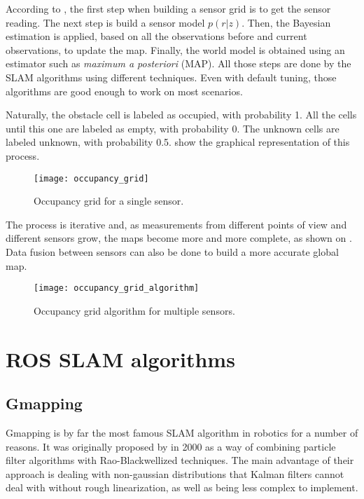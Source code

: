 According to , the first step when building a sensor grid is to get the sensor reading. The next step is build a sensor model $p(r|z)$. Then, the Bayesian estimation is applied, based on all the observations before and current observations, to update the map. Finally, the world model is obtained using an estimator such as \textit{maximum a posteriori} (MAP). All those steps are done by the SLAM algorithms using different techniques. Even with default tuning, those algorithms are good enough to work on most scenarios.

Naturally, the obstacle cell is labeled as occupied, with probability 1. All the cells until this one are labeled as empty, with probability 0. The unknown cells are labeled unknown, with probability 0.5.  show the graphical representation of this process.

\begin{figure}[!ht]
    \centering
    \texttt{[image: occupancy\_grid]}
    \caption{Occupancy grid for a single sensor.}
    \label{fig:occupancy_grid}
\end{figure}

The process is iterative and, as measurements from different points of view and different sensors grow, the maps become more and more complete, as shown on . Data fusion between sensors can also be done to build a more accurate global map.

\begin{figure}[!ht]
    \centering
    \texttt{[image: occupancy\_grid\_algorithm]}
    \caption{Occupancy grid algorithm for multiple sensors.}
    \label{fig:occupancy_grid_algorithm}
\end{figure}

\section{ROS SLAM algorithms}

\subsection{Gmapping}

Gmapping is by far the most famous SLAM algorithm in robotics for a number of reasons. It was originally proposed by \citeauthor{doucet2000rao} in 2000 as a way of combining particle filter algorithms with Rao-Blackwellized techniques. The main advantage of their approach is dealing with non-gaussian distributions that Kalman filters cannot deal with without rough linearization, as well as being less complex to implement.


